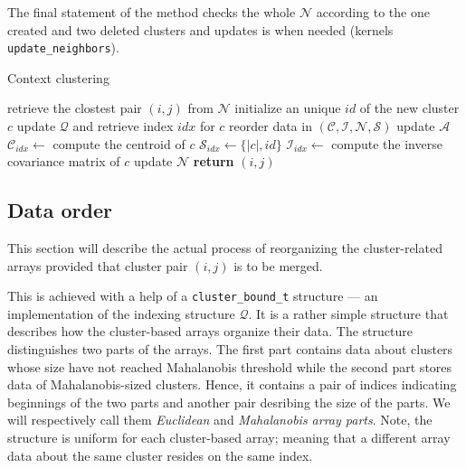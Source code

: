 \begin{description}
	The final statement of the method checks the whole $\mathcal{N}$  according to the one created and two deleted clusters and updates is when needed (kernels \texttt{update\_neighbors}).
	
	\begin{algorithm}
	\caption{Context clustering}
	\label{alg03:context}
	\begin{algorithmic}[1]
		\State retrieve the clostest pair $(i,j)$ from $\mathcal{N}$
		\State initialize an unique $id$ of the new cluster $c$
		\State update $\mathcal{Q}$ and retrieve index $idx$ for $c$
		\State reorder data in $(\mathcal{C},\mathcal{I},\mathcal{N},\mathcal{S})$
		\State update $\mathcal{A}$
		\State $\mathcal{C}_{idx} \gets$ compute the centroid of $c$
		\State $\mathcal{S}_{idx} \gets \{|c|, id\}$
		\State $\mathcal{I}_{idx} \gets$ compute the inverse covariance matrix of $c$
		\EndIf
		\State update $\mathcal{N}$
		\State \textbf{return} $(i,j)$
		\EndProcedure
	\end{algorithmic}
\end{algorithm}

\end{description}


\subsection{Data order}

This section will describe the actual process of reorganizing the cluster-related arrays provided that cluster pair $(i,j)$ is to be merged.

This is achieved with a help of a \texttt{cluster\_bound\_t} structure --- an implementation of the indexing structure $\mathcal{Q}$. It is a rather simple structure that describes how the cluster-based arrays organize their data. The structure distinguishes two parts of the arrays. The first part contains data about clusters whose size have not reached Mahalanobis threshold while the second part stores data of Mahalanobis-sized clusters. Hence, it contains a pair of indices indicating beginnings of the two parts and another pair desribing the size of the parts. We will respectively call them \emph{Euclidean} and \emph{Mahalanobis array parts}. Note, the structure is uniform for each cluster-based array; meaning that a different array data about the same cluster resides on the same index.

